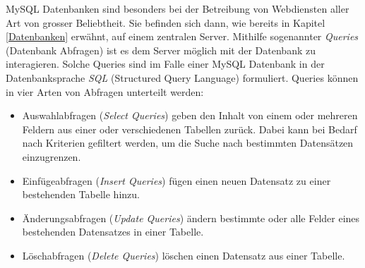 \documentclass[../main.tex]{subfiles}
\begin{document}
	MySQL Datenbanken sind besonders bei der Betreibung von Webdiensten aller Art von grosser Beliebtheit. Sie befinden sich dann, wie bereits in Kapitel \ref{Datenbanken} erwähnt, auf einem zentralen Server. Mithilfe sogenannter \emph{Queries} (Datenbank Abfragen) ist es dem Server möglich mit der Datenbank zu interagieren. Solche Queries sind im Falle einer MySQL Datenbank in der Datenbanksprache \emph{SQL} (Structured Query Language) formuliert. Queries können in vier Arten von Abfragen unterteilt werden: \cite[S. 760]{IT-Handbuch}
	
	\begin{itemize}
		\item Auswahlabfragen (\emph{Select Queries}) geben den Inhalt von einem oder mehreren Feldern aus einer oder verschiedenen Tabellen zurück. Dabei kann bei Bedarf nach Kriterien gefiltert werden, um die Suche nach bestimmten Datensätzen einzugrenzen.\cite[S. 746]{IT-Handbuch}
		\item Einfügeabfragen (\emph{Insert Queries}) fügen einen neuen Datensatz zu einer bestehenden Tabelle hinzu.\cite[S. 746]{IT-Handbuch}
		\item Änderungsabfragen (\emph{Update Queries}) ändern bestimmte oder alle Felder eines bestehenden Datensatzes in einer Tabelle.\cite[S. 746]{IT-Handbuch}
		\item Löschabfragen (\emph{Delete Queries}) löschen einen Datensatz aus einer Tabelle. \cite[S. 746]{IT-Handbuch}
	\end{itemize}
	
\end{document}
